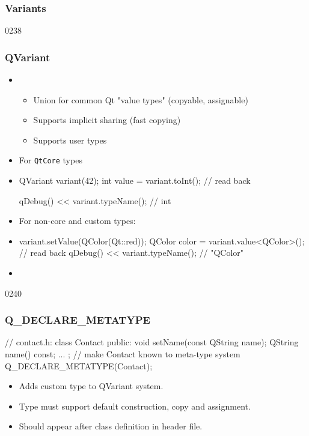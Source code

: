 %
%
%
%

\subsubsection{Variants}

\begin{slide}[fragile]{0238}\frametitle{QVariant}
\begin{itemize}
  \item {} 
  \begin{itemize}
    \item Union for common Qt "value types" (copyable, assignable)
    \item Supports implicit sharing (fast copying)
    \item Supports user types
  \end{itemize}
  \item For \texttt{QtCore} types  
  \item[] \begin{cpp}
QVariant variant(42);
int value = variant.toInt(); // read back

qDebug() << variant.typeName(); // int
\end{cpp}
\item For non-core and custom types:
  \item[] \begin{cpp}
variant.setValue(QColor(Qt::red));
QColor color = variant.value<QColor>(); // read back
qDebug() << variant.typeName(); // "QColor"
\end{cpp}
\item {}
\end{itemize}
\end{slide}

\begin{slide}[fragile]{0240}
\frametitle{Q\_DECLARE\_METATYPE}
\begin{cpp}
// contact.h:
class Contact {
public:
  void setName(const QString name);
  QString name() const;
  ...
};
// make Contact known to meta-type system
Q_DECLARE_METATYPE(Contact);
\end{cpp} 
\begin{itemize}
\item Adds custom type to QVariant system.
\item Type must support default construction, copy and assignment.
\item Should appear after class definition in header file.
\end{itemize}
\end{slide}


